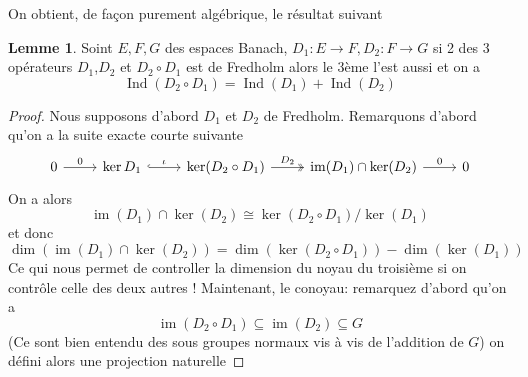 \documentclass[a4paper,12pt,oneside,titlepage]{article}
\newcommand{\im}[0]{\operatorname{im}}
\theoremstyle{definition}
\newtheorem{lemme}[definition]{Lemme}
\theoremstyle{plain}
\begin{document}
On obtient, de façon purement algébrique, le résultat suivant
\begin{lemme}\label{lemma-compo}
    Soint $E,F,G$ des espaces Banach, $D_1:E\rightarrow F, D_2: F\rightarrow G$ si 2 des 3 opérateurs $D_1$,$D_2$ et $D_2\circ D_1$ est de Fredholm alors le 3ème l'est aussi et on a 
    \begin{equation*}
        \operatorname{Ind}(D_2\circ D_1)= \operatorname{Ind}(D_1)+\operatorname{Ind}(D_2)
    \end{equation*}
\end{lemme}
\begin{proof}
    Nous supposons d'abord $D_1$ et $D_2$ de Fredholm.
    Remarquons d'abord qu'on a la suite exacte courte suivante
    \[\begin{tikzcd}
	0 & {\ker D_1} & {\ker (D_2\circ D_1)} & {\operatorname{im}(D_1)\cap \ker (D_2)} & 0
	\arrow["0", from=1-1, to=1-2]
	\arrow["\iota", hook, from=1-2, to=1-3]
	\arrow["{D_2}", two heads, from=1-3, to=1-4]
	\arrow["0", from=1-4, to=1-5]
    \end{tikzcd}\]
On a alors
    \begin{equation*}
        \operatorname{im}(D_1)\cap \ker (D_2) \cong \ker (D_2\circ D_1)/\ker (D_1)
    \end{equation*}
et donc
\begin{equation*}
    \dim (\im (D_1)\cap \ker (D_2))= \dim(\ker (D_2\circ D_1))-\dim(\ker (D_1))
\end{equation*}
Ce qui nous permet de controller la dimension du noyau du troisième si on contrôle celle des deux autres ! Maintenant, le conoyau: remarquez d'abord qu'on a
\begin{equation*}
    \im(D_2\circ D_1)\subseteq \im(D_2)\subseteq G
\end{equation*}
(Ce sont bien entendu des sous groupes normaux vis à vis de l'addition de $G$) on défini alors une projection naturelle


\end{proof}
\end{document}
